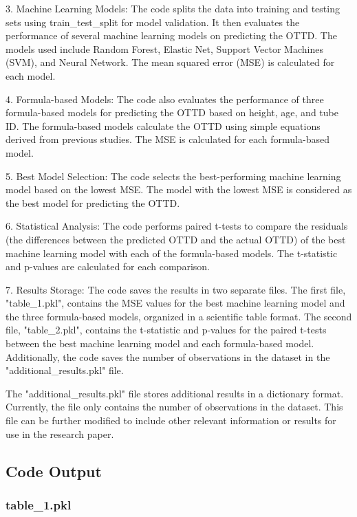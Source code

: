 \documentclass[11pt]{article}
\begin{document}
3. Machine Learning Models: The code splits the data into training and testing sets using train\_test\_split for model validation. It then evaluates the performance of several machine learning models on predicting the OTTD. The models used include Random Forest, Elastic Net, Support Vector Machines (SVM), and Neural Network. The mean squared error (MSE) is calculated for each model.

4. Formula-based Models: The code also evaluates the performance of three formula-based models for predicting the OTTD based on height, age, and tube ID. The formula-based models calculate the OTTD using simple equations derived from previous studies. The MSE is calculated for each formula-based model.

5. Best Model Selection: The code selects the best-performing machine learning model based on the lowest MSE. The model with the lowest MSE is considered as the best model for predicting the OTTD.

6. Statistical Analysis: The code performs paired t-tests to compare the residuals (the differences between the predicted OTTD and the actual OTTD) of the best machine learning model with each of the formula-based models. The t-statistic and p-values are calculated for each comparison.

7. Results Storage: The code saves the results in two separate files. The first file, "table\_1.pkl", contains the MSE values for the best machine learning model and the three formula-based models, organized in a scientific table format. The second file, "table\_2.pkl", contains the t-statistic and p-values for the paired t-tests between the best machine learning model and each formula-based model. Additionally, the code saves the number of observations in the dataset in the "additional\_results.pkl" file.

The "additional\_results.pkl" file stores additional results in a dictionary format. Currently, the file only contains the number of observations in the dataset. This file can be further modified to include other relevant information or results for use in the research paper.

\subsection{Code Output}

\subsubsection*{table\_1.pkl}
\end{document}
